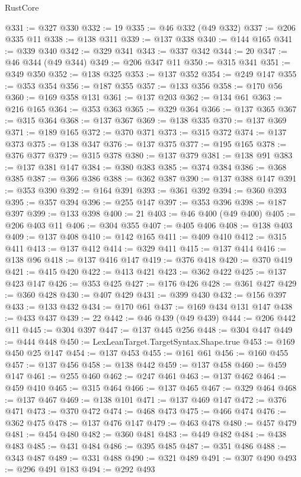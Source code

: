 \begin{lexlean}{RustCore}
\begin{coremodule}
@331 := @327 @330
@332 := 19
@335 := @46 @332 (@49 @332)
@337 := @206 @335 @11
@338 := @138 @311
@339 := @137 @338
@340 := @144 @165
@341 := @339 @340
@342 := @329 @341
@343 := @337 @342
@344 := 20
@347 := @46 @344 (@49 @344)
@349 := @206 @347 @11
@350 := @315 @341
@351 := @349 @350
@352 := @138 @325
@353 := @137 @352
@354 := @249 @147
@355 := @353 @354
@356 := @187 @355
@357 := @133 @356
@358 := @170 @56
@360 := @169 @358 @131
@361 := @137 @203
@362 := @134 @61
@363 := @216 @165
@364 := @353 @363
@365 := @329 @364
@366 := @137 @365
@367 := @315 @364
@368 := @137 @367
@369 := @138 @335
@370 := @137 @369
@371 := @189 @165
@372 := @370 @371
@373 := @315 @372
@374 := @137 @373
@375 := @138 @347
@376 := @137 @375
@377 := @195 @165
@378 := @376 @377
@379 := @315 @378
@380 := @137 @379
@381 := @138 @91
@383 := @137 @381 @147
@384 := @380 @383
@385 := @374 @384
@386 := @368 @385
@387 := @366 @386
@388 := @362 @387
@390 := @137 @388 @147
@391 := @353 @390
@392 := @164 @391
@393 := @361 @392
@394 := @360 @393
@395 := @357 @394
@396 := @255 @147
@397 := @353 @396
@398 := @187 @397
@399 := @133 @398
@400 := 21
@403 := @46 @400 (@49 @400)
@405 := @206 @403 @11
@406 := @304 @355
@407 := @405 @406
@408 := @138 @403
@409 := @137 @408
@410 := @142 @165
@411 := @409 @410
@412 := @315 @411
@413 := @137 @412
@414 := @329 @411
@415 := @137 @414
@416 := @138 @96
@418 := @137 @416 @147
@419 := @376 @418
@420 := @370 @419
@421 := @415 @420
@422 := @413 @421
@423 := @362 @422
@425 := @137 @423 @147
@426 := @353 @425
@427 := @176 @426
@428 := @361 @427
@429 := @360 @428
@430 := @407 @429
@431 := @399 @430
@432 := @156 @397
@433 := @133 @432
@434 := @170 @61
@437 := @169 @434 @131 @147
@438 := @433 @437
@439 := 22
@442 := @46 @439 (@49 @439)
@444 := @206 @442 @11
@445 := @304 @397
@447 := @137 @445 @256
@448 := @304 @447
@449 := @444 @448
@450 := LexLeanTarget.TargetSyntax.Shape.true
@453 := @169 @450 @25 @147
@454 := @137 @453
@455 := @161 @61
@456 := @160 @455
@457 := @137 @456
@458 := @138 @442
@459 := @137 @458
@460 := @459 @147
@461 := @255 @460
@462 := @247 @461
@463 := @137 @462
@464 := @459 @410
@465 := @315 @464
@466 := @137 @465
@467 := @329 @464
@468 := @137 @467
@469 := @138 @101
@471 := @137 @469 @147
@472 := @376 @471
@473 := @370 @472
@474 := @468 @473
@475 := @466 @474
@476 := @362 @475
@478 := @137 @476 @147
@479 := @463 @478
@480 := @457 @479
@481 := @454 @480
@482 := @360 @481
@483 := @449 @482
@484 := @438 @483
@485 := @431 @484
@486 := @395 @485
@487 := @351 @486
@488 := @343 @487
@489 := @331 @488
@490 := @321 @489
@491 := @307 @490
@493 := @296 @491 @183
@494 := @292 @493

\end{coremodule}
\end{lexlean}
